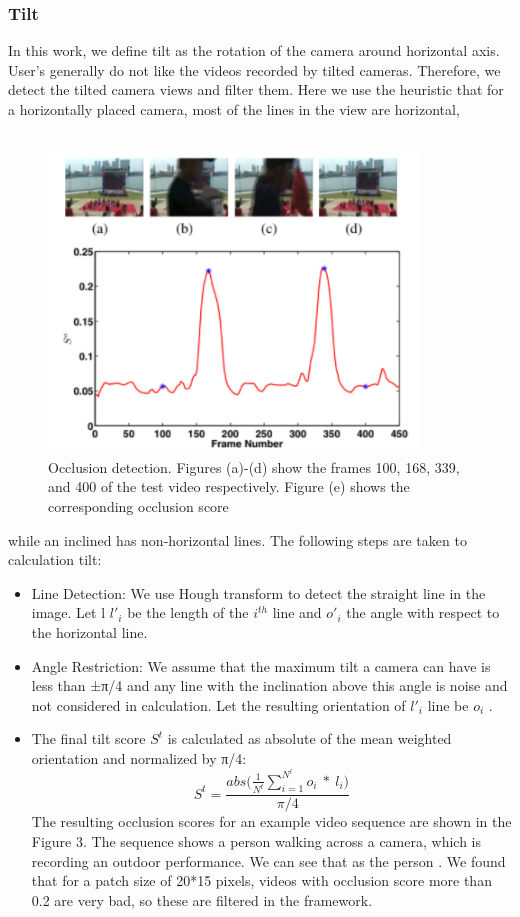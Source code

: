 \documentclass{sig-alternate}
\begin{document}
\subsubsection{Tilt}In this work, we define tilt as the rotation of the camera around
horizontal axis. User’s generally do not like the videos recorded
by tilted cameras. Therefore, we detect the tilted camera views
and filter them. Here we use the heuristic that for a horizontally
placed camera, most of the lines in the view are horizontal, \\\\
\begin{figure}
    \centering
    \includegraphics{img3.png}
    \caption{Occlusion detection. Figures (a)-(d) show the frames
100, 168, 339, and 400 of the test video respectively. Figure (e)
shows the corresponding occlusion score}
    \label{fig:my_label}
\end{figure}

while
an inclined has non-horizontal lines. The following steps are taken to calculation tilt:
\begin{itemize}
    \item Line Detection: We use Hough transform to detect the straight
line in the image. Let l ${l'_i}$ be the length of the ${i^{th}}$ line and 
${o'_i}$ the angle with respect to the horizontal line.\item Angle Restriction: We assume that the maximum tilt a camera can have is less than ±π/4 and any line with the inclination above this angle is noise and not considered in calculation. Let the resulting orientation of ${l'_i}$ line be ${o_i}$ .
    \item The final tilt score ${S^{t}}$ is calculated as absolute of the mean
weighted orientation and normalized by π/4:
\begin{equation}
S^t =  \frac{abs \big( \frac{1}{N^t} \sum_{i=1}^{N^l}o_i\ *\  l_i \big)}{\pi/4}
\end{equation}
The resulting occlusion scores for an example video sequence
are shown in the Figure 3. The sequence shows a person walking
across a camera, which is recording an outdoor performance. We
can see that as the person . We found that
for a patch size of 20*15 pixels, videos with occlusion score more
than 0.2 are very bad, so these are filtered in the framework.
\end{itemize}
\end{document}
